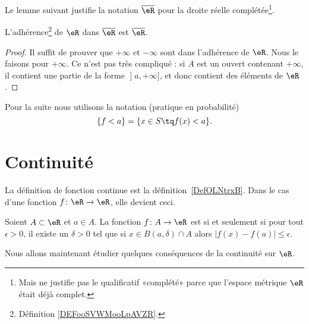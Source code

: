Le lemme suivant justifie la notation \( \overline{ \eR }\) pour la droite réelle complétée\footnote{Mais ne justifie pas le qualificatif «complété» parce que l'espace métrique \( \eR\) était déjà complet.}.
\begin{lemma}       \label{LEMooPZXHooEEXsTC}
    L'adhérence\footnote{Définition \ref{DEFooSVWMooLpAVZR}.} de \( \eR\) dans \( \overline{ \eR }\) est \( \overline{ \eR }\).
\end{lemma}

\begin{proof}
    Il suffit de prouver que \( +\infty\) et \( -\infty\) sont dans l'adhérence de \( \eR\). Nous le faisons pour \( +\infty\). Ce n'est pas très compliqué : si \( A\) est un ouvert contenant \( +\infty\), il contient une partie de la forme \( \mathopen] a , +\infty \mathclose]\), et donc contient des éléments de \( \eR\).
\end{proof}

Pour la suite nous utilisons la notation (pratique en probabilité)
\begin{equation}
    \{ f<a \}=\{ x\in S\tq f(x)<a \}.
\end{equation}


\section{Continuité}

La définition de fonction continue est la définition~\ref{DefOLNtrxB}. Dans le cas d'une fonction \( f\colon \eR\to \eR\), elle devient ceci.
\begin{proposition}      \label{PROPooVNGEooPwbxXP}
    Soient \( A\subset \eR\) et \( a\in A\). La fonction \( f\colon A\to \eR\) est  si et seulement si pour tout \( \epsilon>0\), il existe un \( \delta>0\) tel que si \( x\in B(a,\delta)\cap A\) alors \( | f(x)-f(a) |\leq \epsilon\).
\end{proposition}

Nous allons maintenant étudier quelques conséquences de la continuité sur \( \eR\).

